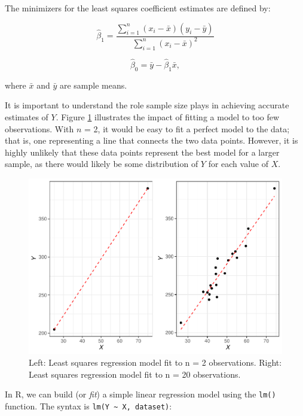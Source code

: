 \documentclass[
]{book}
\begin{document}
The minimizers for the least squares coefficient estimates are defined by:

\[\hat\beta_1 = \frac{\displaystyle\sum_{i=1}^{n}(x_i - \bar{x})(y_i - \bar{y})} {\displaystyle\sum_{i=1}^{n}(x_i - \bar{x})^2}\]

\[\hat\beta_0 = \bar{y} - \hat{\beta}_1 \bar{x},\]

where \(\bar{x}\) and \(\bar{y}\) are sample means.

It is important to understand the role sample size plays in achieving accurate estimates of \(Y\). Figure \ref{fig:lm-fit-compare} illustrates the impact of fitting a model to too few observations. With \(n\) = 2, it would be easy to fit a perfect model to the data; that is, one representing a line that connects the two data points. However, it is highly unlikely that these data points represent the best model for a larger sample, as there would likely be some distribution of \(Y\) for each value of \(X\).

\begin{figure}

{\centering \includegraphics[width=1\linewidth]{People_Analytics_Lifecycle_files/figure-latex/lm-fit-compare-1} 

}

\caption{Left: Least squares regression model fit to n = 2 observations. Right: Least squares regression model fit to n = 20 observations.}\label{fig:lm-fit-compare}
\end{figure}

In R, we can build (or \emph{fit}) a simple linear regression model using the \texttt{lm()} function. The syntax is \texttt{lm(Y\ \textasciitilde{}\ X,\ dataset)}:
\end{document}
